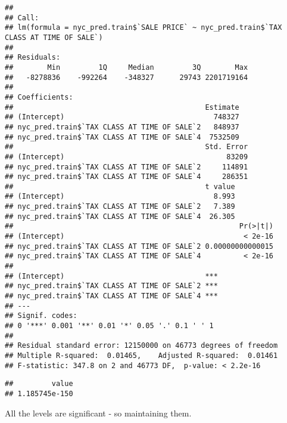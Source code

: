 \documentclass[
  a3paper,
]{article}
\newenvironment{Shaded}{\begin{snugshade}}{\end{snugshade}}
\newcommand{\DataTypeTok}[1]{\textcolor[rgb]{0.13,0.29,0.53}{#1}}
\newcommand{\DecValTok}[1]{\textcolor[rgb]{0.00,0.00,0.81}{#1}}
\newcommand{\KeywordTok}[1]{\textcolor[rgb]{0.13,0.29,0.53}{\textbf{#1}}}
\newcommand{\NormalTok}[1]{#1}
\newcommand{\OperatorTok}[1]{\textcolor[rgb]{0.81,0.36,0.00}{\textbf{#1}}}
\newcommand{\OtherTok}[1]{\textcolor[rgb]{0.56,0.35,0.01}{#1}}
\begin{document}
\begin{verbatim}
## 
## Call:
## lm(formula = nyc_pred.train$`SALE PRICE` ~ nyc_pred.train$`TAX CLASS AT TIME OF SALE`)
## 
## Residuals:
##        Min         1Q     Median         3Q        Max 
##   -8278836    -992264    -348327      29743 2201719164 
## 
## Coefficients:
##                                             Estimate
## (Intercept)                                   748327
## nyc_pred.train$`TAX CLASS AT TIME OF SALE`2   848937
## nyc_pred.train$`TAX CLASS AT TIME OF SALE`4  7532509
##                                             Std. Error
## (Intercept)                                      83209
## nyc_pred.train$`TAX CLASS AT TIME OF SALE`2     114891
## nyc_pred.train$`TAX CLASS AT TIME OF SALE`4     286351
##                                             t value
## (Intercept)                                   8.993
## nyc_pred.train$`TAX CLASS AT TIME OF SALE`2   7.389
## nyc_pred.train$`TAX CLASS AT TIME OF SALE`4  26.305
##                                                     Pr(>|t|)
## (Intercept)                                          < 2e-16
## nyc_pred.train$`TAX CLASS AT TIME OF SALE`2 0.00000000000015
## nyc_pred.train$`TAX CLASS AT TIME OF SALE`4          < 2e-16
##                                                
## (Intercept)                                 ***
## nyc_pred.train$`TAX CLASS AT TIME OF SALE`2 ***
## nyc_pred.train$`TAX CLASS AT TIME OF SALE`4 ***
## ---
## Signif. codes:  
## 0 '***' 0.001 '**' 0.01 '*' 0.05 '.' 0.1 ' ' 1
## 
## Residual standard error: 12150000 on 46773 degrees of freedom
## Multiple R-squared:  0.01465,    Adjusted R-squared:  0.01461 
## F-statistic: 347.8 on 2 and 46773 DF,  p-value: < 2.2e-16
\end{verbatim}

\begin{Shaded}
\end{Shaded}

\begin{verbatim}
##         value 
## 1.185745e-150
\end{verbatim}

All the levels are significant - so maintaining them.
\end{document}
